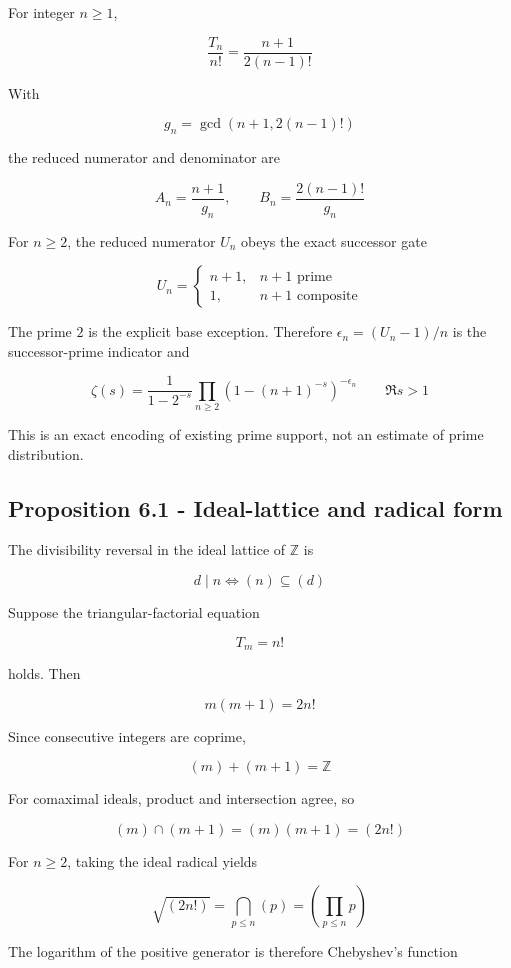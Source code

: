 \documentclass[
  11pt,
]{book}
\begin{document}
For integer \(n\ge1\),

\[
\frac{T_n}{n!}=\frac{n+1}{2(n-1)!}
\]

With

\[
g_n=\gcd(n+1,2(n-1)!)
\]

the reduced numerator and denominator are

\[
A_n=\frac{n+1}{g_n},\qquad
B_n=\frac{2(n-1)!}{g_n}
\]

For \(n\ge2\), the reduced numerator \(U_n\) obeys the exact successor
gate

\[
\boxed{
U_n=
\begin{cases}
n+1,&n+1\text{ prime}\\
1,&n+1\text{ composite}
\end{cases}}
\]

The prime \(2\) is the explicit base exception. Therefore
\(\epsilon_n=(U_n-1)/n\) is the successor-prime indicator and

\[
\zeta(s)=\frac1{1-2^{-s}}
\prod_{n\ge2}\left(1-(n+1)^{-s}\right)^{-\epsilon_n}
\qquad \Re s>1
\]

This is an exact encoding of existing prime support, not an estimate of
prime distribution.

\subsection{Proposition 6.1 - Ideal-lattice and radical
form}\label{proposition-6.1---ideal-lattice-and-radical-form}

The divisibility reversal in the ideal lattice of \(\mathbb Z\) is

\[
\boxed{d\mid n\iff(n)\subseteq(d)}
\]

Suppose the triangular-factorial equation

\[
T_m=n!
\]

holds. Then

\[
m(m+1)=2n!
\]

Since consecutive integers are coprime,

\[
(m)+(m+1)=\mathbb Z
\]

For comaximal ideals, product and intersection agree, so

\[
\boxed{
(m)\cap(m+1)=(m)(m+1)=(2n!)
}
\]

For \(n\ge2\), taking the ideal radical yields

\[
\boxed{
\sqrt{(2n!)}
=\bigcap_{p\le n}(p)
=\left(\prod_{p\le n}p\right)
}
\]

The logarithm of the positive generator is therefore Chebyshev's
function
\end{document}
